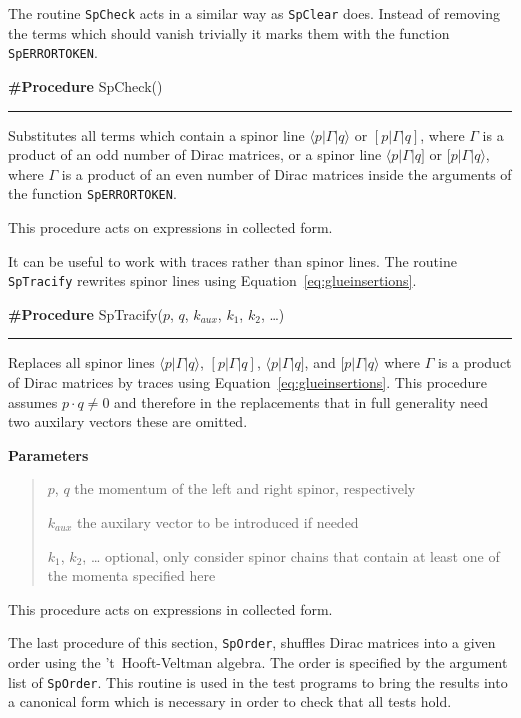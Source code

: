 \documentclass[preprint,number,12pt,sort&compress]{elsarticle}
\newcommand{\Spaa}[1]{\langle #1 \rangle}
\newcommand{\Spab}[1]{\langle #1]}
\newcommand{\Spba}[1]{[ #1 \rangle}
\newcommand{\Spbb}[1]{[ #1 ]}
\newlength{\funcindent}
\newlength{\funcwidth}
\newenvironment{Ventry}[1]%
 {\begin{list}{}{%
   \renewcommand{\makelabel}[1]{\texttt{##1:}\hfil}%
   \settowidth{\labelwidth}{\texttt{#1:}}%
   \setlength{\leftmargin}{\labelsep}%
   \addtolength{\leftmargin}{\labelwidth}}}%
 {\end{list}}
\newenvironment{Procedure}[2]{%
\hspace{.8\funcindent}\begin{boxedminipage}{\funcwidth}
	\raggedright \textbf{\#Procedure} #1(#2)

	\vspace{-1.5ex}

	\rule{\textwidth}{0.5\fboxrule}
	\setlength{\parskip}{2ex}
}{\end{boxedminipage}}
\newenvironment{Parameters}{%
	\setlength{\parskip}{1ex}
	\textbf{Parameters}
	\vspace{-1ex}
	\begin{quote}}{%
	\end{quote}}
\begin{document}
The routine \texttt{SpCheck}
acts in a similar way as \texttt{SpClear} does.
Instead of removing the terms which should vanish trivially
it marks them with the function \texttt{SpERRORTOKEN}.

\medskip
\begin{Procedure}{SpCheck}{}
   Substitutes all terms which contain a spinor line
	$\Spaa{p\vert\Gamma\vert q}$ or $\Spbb{p\vert\Gamma\vert q}$,
	where $\Gamma$ is a product of an odd number of Dirac matrices,
	or a spinor line
	$\Spab{p\vert\Gamma\vert q}$ or $\Spba{p\vert\Gamma\vert q}$,
	where $\Gamma$ is a product of an even number of Dirac matrices
	inside the arguments of the function \texttt{SpERRORTOKEN}.

	This procedure acts on expressions in collected form.
\end{Procedure}
\medskip

It can be useful to work with traces rather than spinor lines.
The routine \texttt{SpTracify} rewrites spinor lines using
Equation~\eqref{eq:glueinsertions}.

\medskip
\begin{Procedure}{SpTracify}{$p$, $q$, $k_{aux}$, $k_1$, $k_2$, \dots}
	Replaces all spinor lines $\Spaa{p\vert\Gamma\vert q}$, 
	$\Spbb{p\vert\Gamma\vert q}$, $\Spab{p\vert\Gamma\vert q}$, 
	and $\Spba{p\vert\Gamma\vert q}$ where $\Gamma$ is a product
	of Dirac matrices	by traces using Equation~\eqref{eq:glueinsertions}.
	This procedure assumes $p\cdot{}q\neq0$ and therefore in the replacements
   that in full generality need two auxilary vectors these are omitted.

	\begin{Parameters}
		\begin{Ventry}{$p$, $q$}
			\item[$p$, $q$] the momentum of the left and right spinor, respectively
			\item[$k_{aux}$] the auxilary vector to be introduced if needed
			\item[$k_1$, $k_2$, \dots] optional, only consider spinor chains
						that contain at least one of the momenta specified here
		\end{Ventry}
	\end{Parameters}

	This procedure acts on expressions in collected form.
\end{Procedure}
\medskip

The last procedure of this section, \texttt{SpOrder}, shuffles
Dirac matrices into a given order using the 't~Hooft-Veltman
algebra. The order is specified by the argument list of
\texttt{SpOrder}. This routine is used in the test programs
to bring the results into a canonical form which is necessary
in order to check that all tests hold.
\end{document}

